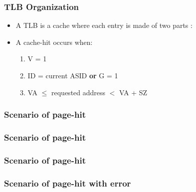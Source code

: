 \begin{frame}
  \frametitle{TLB Organization}

    \begin{itemize}
      \item A TLB is a cache where each entry is made of two parts :

      \begin{center}
      \end{center}

      \item A cache-hit occurs when:
      \begin{enumerate}
      \item
        V = 1
      \item
        ID = current ASID \textbf{or} G = 1
      \item
        VA $\leq$ requested address $<$ VA + SZ
      \end{enumerate}
    \end{itemize}
\end{frame}


\begin{frame}
  \frametitle{Scenario of page-hit}

  \begin{center}
  \end{center}

\end{frame}


\begin{frame}
  \frametitle{Scenario of page-hit}

  \begin{center}
  \end{center}

\end{frame}


\begin{frame}
  \frametitle{Scenario of page-hit}

  \begin{center}
  \end{center}

\end{frame}


\begin{frame}
  \frametitle{Scenario of page-hit with error}



\end{frame}


